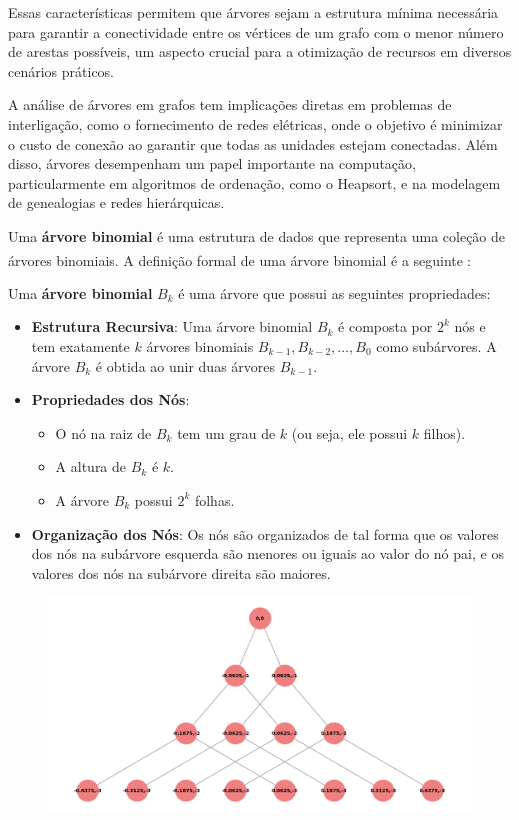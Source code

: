 \documentclass[12pt, a4paper]{scrreprt}
\begin{document}
Essas características permitem que árvores sejam a estrutura mínima necessária para garantir a conectividade entre os vértices de um grafo com o menor número de arestas possíveis, um aspecto crucial para a otimização de recursos em diversos cenários práticos.

A análise de árvores em grafos tem implicações diretas em problemas de interligação, como o fornecimento de redes elétricas, onde o objetivo é minimizar o custo de conexão ao garantir que todas as unidades estejam conectadas. Além disso, árvores desempenham um papel importante na computação, particularmente em algoritmos de ordenação, como o Heapsort, e na modelagem de genealogias e redes hierárquicas.


Uma \textbf{árvore binomial} é uma estrutura de dados que representa uma coleção de árvores binomiais. A definição formal de uma árvore binomial é a seguinte\textsuperscript{\cite{definicaoarvorebinomialEllis} \cite{definicaoarvorebinomialTarjan}}:

Uma \textbf{árvore binomial} \( B_k \) é uma árvore que possui as seguintes propriedades:

\begin{itemize}
    \item \textbf{Estrutura Recursiva}: Uma árvore binomial \( B_k \) é composta por \( 2^k \) nós e tem exatamente \( k \) árvores binomiais \( B_{k-1}, B_{k-2}, \ldots, B_0 \) como subárvores. A árvore \( B_k \) é obtida ao unir duas árvores \( B_{k-1} \).
    
    \item \textbf{Propriedades dos Nós}: 
    \begin{itemize}
        \item O nó na raiz de \( B_k \) tem um grau de \( k \) (ou seja, ele possui \( k \) filhos).
        \item A altura de \( B_k \) é \( k \).
        \item A árvore \( B_k \) possui \( 2^k \) folhas.
    \end{itemize}
    
    \item \textbf{Organização dos Nós}: Os nós são organizados de tal forma que os valores dos nós na subárvore esquerda são menores ou iguais ao valor do nó pai, e os valores dos nós na subárvore direita são maiores.
\end{itemize}

\begin{figure}[h]
    \centering
    \includegraphics[width=.75\textwidth]{src/arvore_binomial_ordem_3.png}
    \label{fig:exemplo de árvore binomial}
\end{figure}
\end{document}
